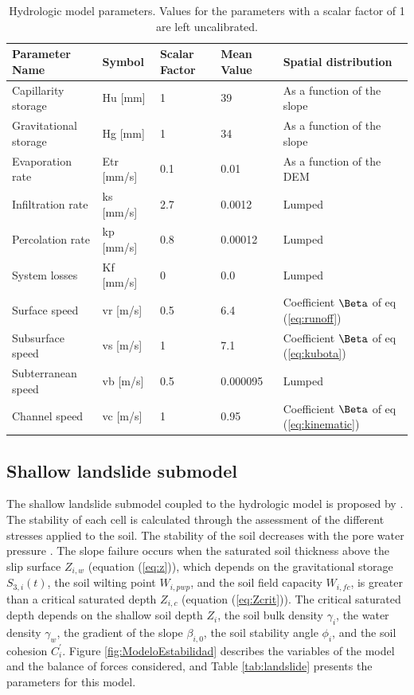 \documentclass[hess, manuscript]{copernicus}
\begin{document}
\begin{table}[]
        \centering
        \begin{tabularx}{\textwidth}{p{3cm} p{2.2cm} p{1.5cm} p{2cm} p{3.5cm}}
\hline
Parameter Name & Symbol & Scalar Factor & Mean Value & Spatial distribution \\
\hline
Capillarity storage & Hu [mm] & 1 & 39 & As a function of the slope \\
Gravitational storage & Hg [mm] & 1 & 34 & As a function of the slope \\
Evaporation rate & Etr [mm/s] & 0.1 & 0.01 & As a function of the DEM \\
Infiltration rate & ks [mm/s] & 2.7 & 0.0012 & Lumped \\
Percolation rate & kp [mm/s] & 0.8 & 0.00012 & Lumped \\
System losses & Kf [mm/s] & 0 & 0.0 & Lumped \\
Surface speed & vr [m/s] & 0.5 & 6.4 & Coefficient $\Beta$ of eq (\ref{eq:runoff}) \\
Subsurface speed & vs [m/s] & 1 & 7.1 & Coefficient $\Beta$ of eq (\ref{eq:kubota})\\
Subterranean speed & vb [m/s] & 0.5 & 0.000095 & Lumped \\
Channel speed & vc [m/s] & 1 & 0.95 & Coefficient $\Beta$ of eq (\ref{eq:kinematic}) \\
\hline
\end{tabularx}
        \caption{Hydrologic model parameters. Values for the parameters with a scalar factor of 1 are left uncalibrated. }
        \label{tab:parameters}
    \end{table}

\subsection{Shallow landslide submodel}

The shallow landslide submodel coupled to the hydrologic model is proposed by  \citet{Aristizabal2016}. The stability of each cell is calculated through the assessment of the different stresses applied to the soil. The stability of the soil decreases with the pore water pressure \citep{Graham1984}. The slope failure occurs when the saturated soil thickness above the slip surface $Z_{i,w}$ (equation (\ref{eq:z})), which depends on the gravitational storage $S_{3,i}(t)$, the soil wilting point $W_{i,pwp}$, and the soil field capacity $W_{i,fc}$, is greater than a critical saturated depth $Z_{i,c}$ (equation (\ref{eq:Zcrit})). The critical saturated depth depends on the shallow soil depth $Z_i$, the soil bulk density $\gamma_i$, the water density $\gamma_w$, the gradient of the slope $\beta_{i,0}$, the soil stability angle $\phi_i$, and the soil cohesion $C^{'}_i$.  Figure \ref{fig:ModeloEstabilidad} describes the variables of the model and the balance of forces considered, and Table \ref{tab:landslide} presents the parameters for this model.
\end{document}
